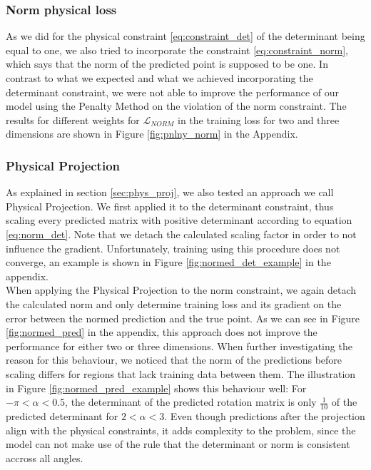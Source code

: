 \subsubsection{Norm physical loss}
As we did for the physical constraint \eqref{eq:constraint_det} of the determinant being equal to one, we also tried to incorporate the constraint \eqref{eq:constraint_norm}, which says that the norm of the predicted point is supposed to be one. In contrast to what we expected and what we achieved incorporating the determinant constraint, we were not able to improve the performance of our model using the Penalty Method on the violation of the norm constraint. The results for different weights for $\mathcal{L}_{NORM}$ in the training loss for two and three dimensions are shown in Figure \ref{fig:pnlny_norm} in the Appendix.

\subsubsection{Physical Projection}
As explained in section \ref{sec:phys_proj}, we also tested an approach we call Physical Projection. We first applied it to the determinant constraint, thus scaling every predicted matrix with positive determinant according to equation \eqref{eq:norm_det}. Note that we detach the calculated scaling factor in order to not influence the gradient. Unfortunately, training using this procedure does not converge, an example is shown in Figure \ref{fig:normed_det_example} in the appendix.\\
\indent When applying the Physical Projection to the norm constraint, we again detach the calculated norm and only determine training loss and its gradient on the error between the normed prediction and the true point. As we can see in Figure \ref{fig:normed_pred} in the appendix, this approach does not improve the performance for either two or three dimensions. When further investigating the reason for this behaviour, we noticed that the norm of the predictions before scaling differs for regions that lack training data between them. The illustration in Figure \ref{fig:normed_pred_example} shows this behaviour well: For $-\pi < \alpha < 0.5$, the determinant of the predicted rotation matrix is only $\frac{1}{10}$ of the predicted determinant for $2 < \alpha < 3$. Even though predictions after the projection align with the physical constraints, it adds complexity to the problem, since the model can not make use of the rule that the determinant or norm is consistent accross all angles.







\clearpage

